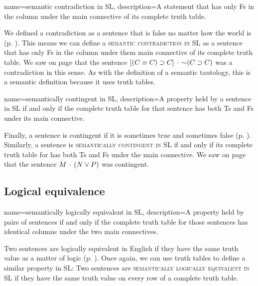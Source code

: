 {
name=semantic contradiction in SL,
description={A statement that has only Fs in the column under the main connective of its complete truth table.}
}

We defined a contradiction as a sentence that is false no matter how the world is (p. \pageref{def:contradiction}). This means we can define a \textsc{\gls{semantic contradiction in SL}} \label{def:semantic_contradiction_in_sl} as a sentence that has only Fs in the column under them main connective of its complete truth table. We saw on page \pageref{contradiction3.1} that the sentence $[(C\equiv C) \supset C] \,\cdot\, \mathord{\sim}(C \supset C)$ was a contradiction in this sense. As with the definition of a semantic tautology, this is a semantic definition because it uses truth tables. 
		
{
name=semantically contingent in SL,
description={A property held by a sentence in SL if and only if the complete truth table for that sentence has both Ts and Fs under its main connective.}
}

Finally, a sentence is contingent if it is sometimes true and sometimes false (p. \pageref{def:contingent_statement}). Similarly, a sentence is \textsc{\gls{semantically contingent in SL}} \label{def:semantically_contingent_in_sl} if and only if its complete truth table for has both Ts and Fs under the main connective. We saw on page \pageref{contingentsentence3.1} that the sentence $M \,\cdot\, (N \vee P)$ was contingent.

\subsection{Logical equivalence}

{
name=semantically logically equivalent in SL,
description={A property held by pairs of sentences if and only if the complete truth table for those sentences has identical columns under the two main connectives.}
}

Two sentences are logically equivalent in English if they have the same truth value as a matter of logic (p. \pageref{def:logical_equivalence}). Once again, we can use truth tables to define a similar property in SL: Two sentences are \textsc{\gls{semantically logically equivalent in SL}} \label{def:semantically_logically_equivalent_in_sl} if they have the same truth value on every row of a complete truth table.


